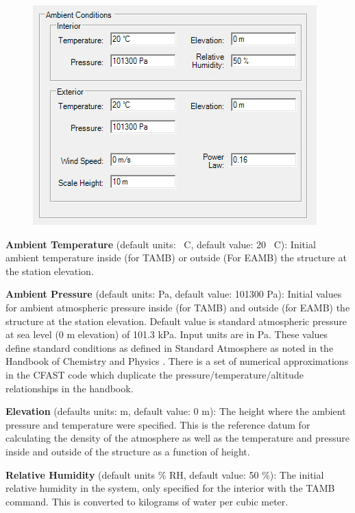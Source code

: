 \begin{figure}[h!]
\begin{center}
\includegraphics[width=4.313in]{FIGURES/Input_File/Ambient_Conditions}
\end{center}
\end{figure}

\textbf{Ambient Temperature} (default units: \degc~C, default value: 20 \degc~C): Initial ambient temperature inside (for TAMB) or outside (For EAMB) the structure at the station elevation.

\textbf{Ambient Pressure} (default units: Pa, default value: 101300 Pa): Initial values for ambient atmospheric pressure inside (for TAMB) and outside (for EAMB) the structure at the station elevation. Default value is standard atmospheric pressure at sea level (0 m elevation) of 101.3 kPa. Input units are in Pa. These values define standard conditions as defined in Standard Atmosphere as noted in the Handbook of Chemistry and Physics  . There is a set of numerical approximations in the CFAST code which duplicate the pressure/temperature/altitude relationships in the handbook.

\textbf{Elevation} (defaults units: m, default value: 0 m): The height where the ambient pressure and temperature were specified.  This is the reference datum for calculating the density of the atmosphere as well as the temperature and pressure inside and outside of the structure as a function of height.

\textbf{Relative Humidity} (default units \% RH, default value: 50 \%): The initial relative humidity in the system, only specified for the interior with the TAMB command.  This is converted to kilograms of water per cubic meter.

